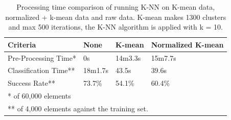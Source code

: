 \begin{table}[H]
\centering


\begin{tabular}{|l|p{2cm}|p{2cm}|p{2cm}|}\hline
Criteria              & None   & K-mean & Normalized K-mean \\ \hline
Pre-Processing Time*  & 0s     & 14m3.3s & 15m7.7s            \\ \hline
Classification Time** & 18m1.7s & 43.5s  & 39.6s             \\ \hline
Success Rate**        & 73.7\% & 54.1\% & 60.4\%            \\ \hline
\multicolumn{4}{|l|}{* of 60,000 elements} \\ 
\multicolumn{4}{|l|}{** of 4,000 elements against the training set.} \\ \hline
\end{tabular}
\caption{Processing time comparison of running K-NN on K-mean data, normalized + k-mean data and raw data. K-mean makes 1300 clusters and max 500 iterations, the K-NN algorithm is applied with k = 10.}
\label{tab:processingtime_kmean_vs_raw_knn}
\end{table}